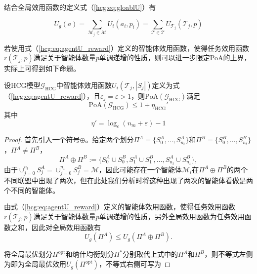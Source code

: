 结合全局效用函数的定义式（\ref{hcg:eq:gloablU}）有

\begin{equation}
\label{hcg:eq:taskU_to_globalU}
	U_g(a) = \sum_{\mathcal{M}_j \in \mathcal{M}} U_i(a_i,p_i) = \sum_{\mathcal{T} \in \mathcal{T}} U_{\mathcal{T}_j}(\mathcal{T}_j,p)
\end{equation}

若使用式（\ref{hcg:eq:agentU_reward}）定义的智能体效用函数，使得任务效用函数$r(\mathcal{T}_j,p)$满足关于智能体数量$p$单调递增的性质，则可以进一步限定PoA的上界，实际上可得到如下命题。

\begin{proposition}
	设HCG模型$\mathcal{G}_{\text{HCG}}$中智能体效用函数$U_i(\mathcal{T}_j,|S_j|)$定义为式（\ref{hcg:eq:agentU_reward}），且$\varepsilon_j=\varepsilon>1$，则$\mathrm{PoA}(\mathcal{G}_{\text{HCG}})$满足
	\begin{equation}
	\label{hcg:eq:PoAforU}
		\mathrm{PoA}(\mathcal{G}_{\text{HCG}}) \leq 1 + \eta_{\text{HCG}}'
	\end{equation}
	其中
	\begin{equation}
	\label{hcg:pro:eq:etapie}
		\eta' = \log_{\varepsilon}(n_m+\varepsilon) -1
	\end{equation}
	
	\begin{proof}
		首先引入一个符号$\oplus$。给定两个划分$\Pi^A = \{S_0^A,\dots,S_{n_t}^A\}$和$\Pi^B = \{S_0^B,\dots,S_{n_t}^B\}$，$\Pi^A \neq \Pi^B$，
		\begin{equation}
		\label{hcg:pro:eq:oplus}
			\Pi^A \oplus \Pi^B := \{S_0^A \cup S_0^B, S_1^A \cup S_1^B, \dots, S_{n_t}^A \cup S_{n_t}^B \},
		\end{equation}
		由于$\cup_{j=0}^{n_t} S_j^A = \cup_{j=0}^{n_t} S_j^B = \mathcal{M}$，因此可能存在一个智能体$\mathcal{M}_i$在$\Pi^A \oplus \Pi^B$的两个不同联盟中出现了两次，但在此处我们分析时将这种出现了两次的智能体看做是两个不同的智能体。
		
		由式（\ref{hcg:eq:agentU_reward}）定义的智能体效用函数，使得任务效用函数$r(\mathcal{T}_j,p)$满足关于智能体数量$p$单调递增的性质，另外全局效用函数为任务效用函数之和，因此对全局效用函数有
		\begin{equation}
		\label{hcg:pro:eq:oplus_inequility}
			U_g(\Pi^A) \leq U_g(\Pi^A \oplus \Pi^B).
		\end{equation}
		
		将全局最优划分$\Pi^{\text{opt}}$和纳什均衡划分$\Pi^*$分别取代上式中的$\Pi^A$和$\Pi^B$，则不等式左侧为即为全局最优效用$U_g(\Pi^{\text{opt}})$，不等式右侧可写为
		

\end{proof}
\end{proposition}
